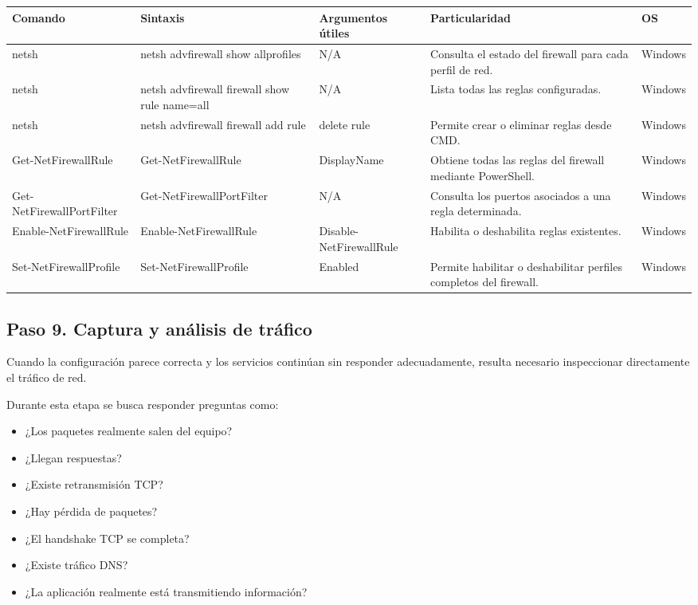 \documentclass[a4paper,10pt]{article}
\begin{document}
\begin{longtable}{|p{2.8cm}|p{3cm}|p{4cm}|p{5.6cm}|p{1.5cm}|}

\hline
Comando &
Sintaxis &
Argumentos útiles &
Particularidad &
OS
\\
\hline
\endhead

netsh &
netsh advfirewall show allprofiles &
N/A &
Consulta el estado del firewall para cada perfil de red. &
Windows
\\
\hline

netsh &
netsh advfirewall firewall show rule name=all &
N/A &
Lista todas las reglas configuradas. &
Windows
\\
\hline

netsh &
netsh advfirewall firewall add rule &
delete rule &
Permite crear o eliminar reglas desde CMD. &
Windows
\\
\hline

Get-NetFirewallRule &
Get-NetFirewallRule &
DisplayName &
Obtiene todas las reglas del firewall mediante PowerShell. &
Windows
\\
\hline

Get-NetFirewallPortFilter &
Get-NetFirewallPortFilter &
N/A &
Consulta los puertos asociados a una regla determinada. &
Windows
\\
\hline

Enable-NetFirewallRule &
Enable-NetFirewallRule &
Disable-NetFirewallRule &
Habilita o deshabilita reglas existentes. &
Windows
\\
\hline

Set-NetFirewallProfile &
Set-NetFirewallProfile &
Enabled &
Permite habilitar o deshabilitar perfiles completos del firewall. &
Windows
\\
\hline

\end{longtable}


\subsection{Paso 9. Captura y análisis de tráfico}

Cuando la configuración parece correcta y los servicios continúan sin responder
adecuadamente, resulta necesario inspeccionar directamente el tráfico de red.

Durante esta etapa se busca responder preguntas como:

\begin{itemize}
\item ¿Los paquetes realmente salen del equipo?
\item ¿Llegan respuestas?
\item ¿Existe retransmisión TCP?
\item ¿Hay pérdida de paquetes?
\item ¿El handshake TCP se completa?
\item ¿Existe tráfico DNS?
\item ¿La aplicación realmente está transmitiendo información?
\end{itemize}
\end{document}
